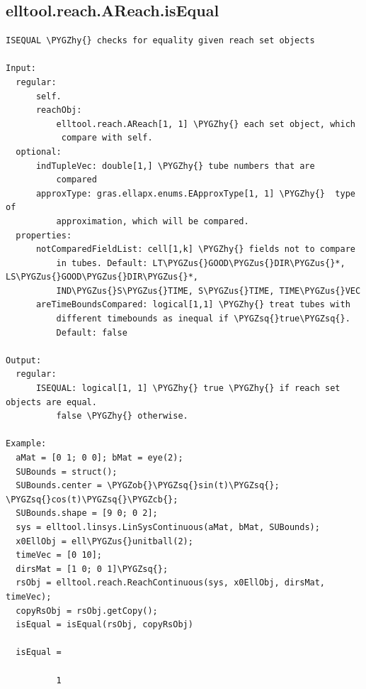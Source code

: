 \documentclass[letterpaper,10pt,english]{sphinxmanual}
\def\PYGZus{\char`\_}
\def\PYGZob{\char`\{}
\def\PYGZcb{\char`\}}
\def\PYGZhy{\char`\-}
\def\PYGZsq{\char`\'}
\begin{document}
\subsection{elltool.reach.AReach.isEqual}
\label{chap_functions:elltool-reach-areach-isequal}
\begin{Verbatim}[commandchars=\\\{\}]
ISEQUAL \PYGZhy{} checks for equality given reach set objects

Input:
  regular:
      self.
      reachObj:
          elltool.reach.AReach[1, 1] \PYGZhy{} each set object, which
           compare with self.
  optional:
      indTupleVec: double[1,] \PYGZhy{} tube numbers that are
          compared
      approxType: gras.ellapx.enums.EApproxType[1, 1] \PYGZhy{}  type of
          approximation, which will be compared.
  properties:
      notComparedFieldList: cell[1,k] \PYGZhy{} fields not to compare
          in tubes. Default: LT\PYGZus{}GOOD\PYGZus{}DIR\PYGZus{}*, LS\PYGZus{}GOOD\PYGZus{}DIR\PYGZus{}*,
          IND\PYGZus{}S\PYGZus{}TIME, S\PYGZus{}TIME, TIME\PYGZus{}VEC
      areTimeBoundsCompared: logical[1,1] \PYGZhy{} treat tubes with
          different timebounds as inequal if \PYGZsq{}true\PYGZsq{}.
          Default: false

Output:
  regular:
      ISEQUAL: logical[1, 1] \PYGZhy{} true \PYGZhy{} if reach set objects are equal.
          false \PYGZhy{} otherwise.

Example:
  aMat = [0 1; 0 0]; bMat = eye(2);
  SUBounds = struct();
  SUBounds.center = \PYGZob{}\PYGZsq{}sin(t)\PYGZsq{}; \PYGZsq{}cos(t)\PYGZsq{}\PYGZcb{};
  SUBounds.shape = [9 0; 0 2];
  sys = elltool.linsys.LinSysContinuous(aMat, bMat, SUBounds);
  x0EllObj = ell\PYGZus{}unitball(2);
  timeVec = [0 10];
  dirsMat = [1 0; 0 1]\PYGZsq{};
  rsObj = elltool.reach.ReachContinuous(sys, x0EllObj, dirsMat, timeVec);
  copyRsObj = rsObj.getCopy();
  isEqual = isEqual(rsObj, copyRsObj)

  isEqual =

          1
\end{Verbatim}
\end{document}
